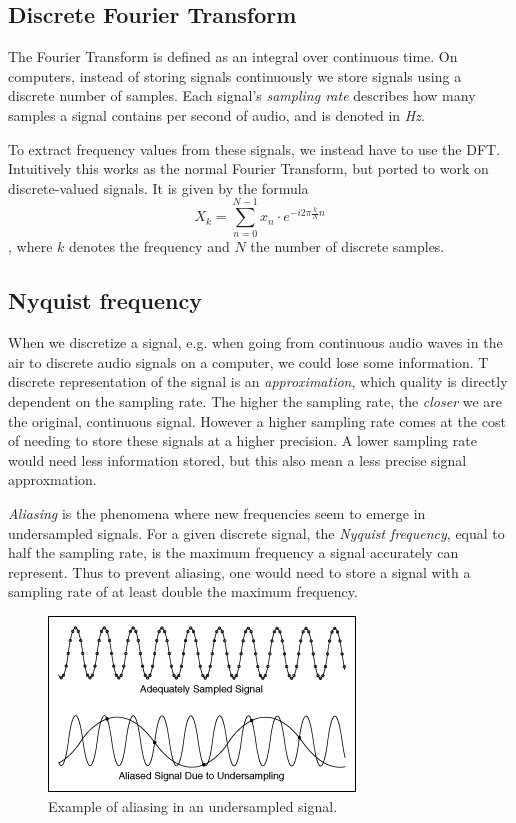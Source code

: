 \subsection{Discrete Fourier Transform}

The Fourier Transform is defined as an integral over continuous time. On computers, instead of storing signals continuously we store signals using a discrete number of samples. Each signal's \textit{sampling rate} describes how many samples a signal contains per second of audio, and is denoted in \textit{Hz}.

To extract frequency values from these signals, we instead have to use the \gls{DFT}. Intuitively this works as the normal Fourier Transform, but ported to work on discrete-valued signals. It is given by the formula $$ X_k = \sum^{N - 1}_{n=0}{x_n \cdot e^{-i 2\pi \frac{k}{N} n}} $$, where $k$ denotes the frequency and $N$ the number of discrete samples.

\subsection{Nyquist frequency}

When we discretize a signal, e.g. when going from continuous audio waves in the air to discrete audio signals on a computer, we could lose some information. T discrete representation of the signal is an \textit{approximation}, which quality is directly dependent on the sampling rate. The higher the sampling rate, the \textit{closer} we are the original, continuous signal. However a higher sampling rate comes at the cost of needing to store these signals at a higher precision. A lower sampling rate would need less information stored, but this also mean a less precise signal approxmation.

\textit{Aliasing} is the phenomena where new frequencies seem to emerge in undersampled signals. For a given discrete signal, the \textit{Nyquist frequency}, equal to half the sampling rate, is the maximum frequency a signal accurately can represent. Thus to prevent aliasing, one would need to store a signal with a sampling rate of at least double the maximum frequency.

\begin{figure}[H]
    \centering
    \includegraphics[scale=2.0]{figures/signalaliasing.png}
    \caption{Example of aliasing in an undersampled signal.}
    \label{AliasingFigure}
\end{figure}

